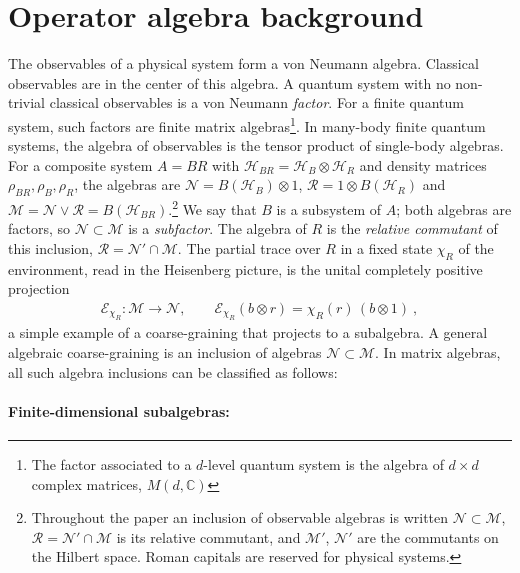 \documentclass[a4paper,11pt]{article}
\theoremstyle{definition}
\newcommand{\mN}{\mathcal{N}}
\newcommand{\mM}{\mathcal{M}}
\begin{document}
\section{Operator algebra background}\label{section:basics}

The observables of a physical system form a von Neumann algebra. Classical observables are in the center of this algebra. A quantum system with no non-trivial classical observables is a von Neumann \emph{factor}. For a finite quantum system, such factors are
finite matrix algebras\footnote{The factor associated to a $d$-level quantum system is the algebra of $d\times d$ complex matrices, $M(d,\mathbb{C})$}. In many-body finite quantum systems, the algebra of observables is the tensor product of single-body algebras. For a composite system $A=BR$ with $\mathcal H_{BR}=\mathcal H_B\otimes\mathcal H_R$ and density matrices $\rho_{BR},\rho_B,\rho_R$, the algebras are $\mathcal N=B(\mathcal H_B)\otimes1$, $\mathcal R=1\otimes B(\mathcal H_R)$ and $\mathcal M=\mathcal N\vee\mathcal R=B(\mathcal H_{BR})$.\footnote{Throughout the paper an inclusion of observable algebras is written $\mathcal N\subset\mathcal M$, $\mathcal R=\mathcal N'\cap\mathcal M$ is its relative commutant, and $\mathcal M'$, $\mathcal N'$ are the commutants on the Hilbert space. Roman capitals are reserved for physical systems.} We say that $B$ is a subsystem of $A$; both algebras are factors, so $\mathcal N\subset\mathcal M$ is a \emph{subfactor}. The algebra of $R$ is the \emph{relative commutant} of this inclusion, $\mathcal R=\mathcal N'\cap\mathcal M$.
The partial trace over $R$ in a fixed state $\chi_R$ of the environment, read in the Heisenberg picture, is the unital completely positive projection
\begin{align}
    \mathcal E_{\chi_R}:\mathcal M\to\mathcal N,\qquad
    \mathcal E_{\chi_R}(b\otimes r)=\chi_R(r)\,(b\otimes 1)\ ,
    \label{eq:slice-expectation-intro}
\end{align}
a simple example of a coarse-graining that projects to a subalgebra. A general algebraic coarse-graining is an inclusion of algebras $\mN\subset \mM$. In matrix algebras, all such algebra inclusions can be classified as follows:

\paragraph{Finite-dimensional subalgebras:}\label{app:finite-coarse}
\end{document}
